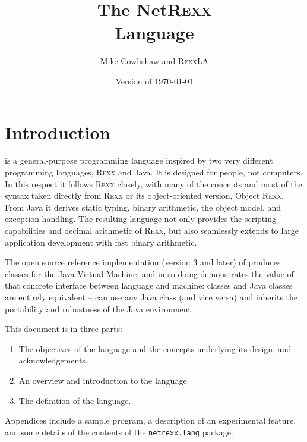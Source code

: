 

\renewcommand{\isbn}{978-94-648-5133-5}
\setcounter{tocdepth}{1}
\title{The NetR\textsc{exx}\protect{}\\Language}
\author{Mike Cowlishaw and R\textsc{exx}LA}
\date{\null\hfill Version  of \today}
\maketitle
{}
\pagestyle{plain}
\frontmatter
{}
\pagestyle{plain}

\tableofcontents

\newpage
{}
\frontmatter
\large

%
\mainmatter
\chapter{Introduction}
\nr{} is a general-purpose programming language inspired by two very
different programming languages, R\textsc{exx}\textsuperscript{\texttrademark} and Java\textsuperscript{\texttrademark}. It is designed for
people, not computers. In this respect it follows R\textsc{exx} closely, with
many of the concepts and most of the syntax taken directly from R\textsc{exx}
or its object-oriented version, Object R\textsc{exx}. From Java it derives
static typing, binary arithmetic, the object model, and exception
handling. The resulting language not only provides the scripting
capabilities and decimal arithmetic of R\textsc{exx}, but also seamlessly
extends to large application development with fast binary arithmetic.

The open source reference implementation (version 3 and later) of
\nr{} produces classes for the Java Virtual Machine, and in so doing
demonstrates the value of that concrete interface between language and
machine: \nr{} classes and Java classes are entirely equivalent –
\nr{} can use any Java class (and vice versa) and inherits the
portability and robustness of the Java environment.

This document is in three parts:
\begin{enumerate}
\item The objectives of the \nr{} language and the concepts underlying its design, and acknowledgements.
\item An overview and introduction to the \nr{} language.
\item The definition of the language.
\end{enumerate}
Appendices include a sample \nr{} program, a description of an experimental feature, and some
details of the contents of the \texttt{netrexx.lang} package.
